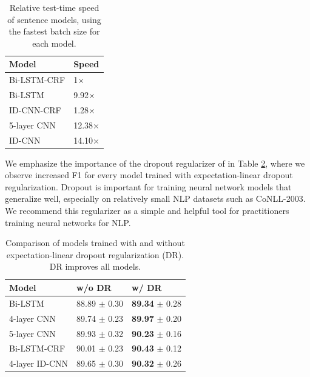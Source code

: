 \begin{table}
\begin{center}
\begin{tabular}{ll}
    Model & Speed \\ \hline \hline
    Bi-LSTM-CRF & 1$\times$ \\ %
    Bi-LSTM & 9.92$\times$ \\ %
    ID-CNN-CRF & 1.28$\times$ \\ %
    5-layer CNN & 12.38$\times$ \\ %
    ID-CNN & 14.10$\times$ \\ %
  \end{tabular}
  \end{center}
  \caption{Relative test-time speed of sentence models, using the fastest batch size for each model.\footnotemark
  \label{sentence-speed-table}}
\end{table}

We emphasize the importance of the dropout regularizer of \citet{ma2017dropout} in Table \ref{dr-table}, where we observe increased F1 for every model trained with expectation-linear dropout regularization. Dropout is important for training neural network models that generalize well, especially on relatively small NLP datasets such as CoNLL-2003. We recommend this regularizer as a simple and helpful tool for practitioners training neural networks for NLP.

\begin{table}
\begin{tabular}{lll}
    Model & w/o DR & w/ DR \\ \hline \hline
    Bi-LSTM & 88.89 $\pm$ 0.30 & {\bf 89.34} $\pm$ 0.28 \\
    4-layer CNN & 89.74 $\pm$ 0.23 & {\bf 89.97} $\pm$ 0.20\\
    5-layer CNN & 89.93 $\pm$ 0.32 & {\bf 90.23} $\pm$ 0.16\\
    Bi-LSTM-CRF & 90.01 $\pm$ 0.23 & {\bf 90.43} $\pm$ 0.12 \\
    4-layer ID-CNN & 89.65 $\pm$ 0.30 & {\bf 90.32} $\pm$ 0.26 \\
  \end{tabular}
  \caption{Comparison of models trained with and without expectation-linear dropout regularization (DR). DR improves all models. \label{dr-table}}
\end{table}

